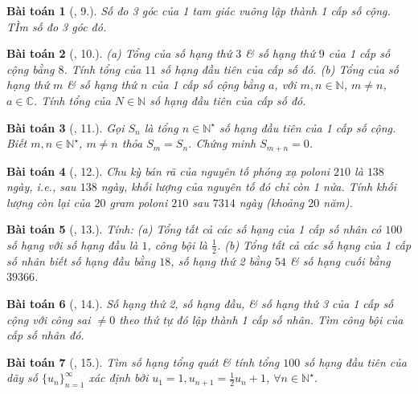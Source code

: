 \documentclass{article}
\newtheorem{baitoan}{Bài toán}
\begin{document}
\begin{baitoan}[\cite{TLCT_dai_so_giai_tich_11}, 9.]
	Số đo 3 góc của 1 tam giác vuông lập thành 1 cấp số cộng. TÌm số đo 3 góc đó.
\end{baitoan}

\begin{baitoan}[\cite{TLCT_dai_so_giai_tich_11}, 10.]
	(a) Tổng của số hạng thứ $3$ \& số hạng thứ $9$ của 1 cấp số cộng bằng $8$. Tính tổng của $11$ số hạng đầu tiên của cấp số đó. (b) Tổng của số hạng thứ $m$ \& số hạng thứ $n$ của 1 cấp số cộng bằng $a$, với $m,n\in\mathbb{N}$, $m\ne n$, $a\in\mathbb{C}$. Tính tổng của $N\in\mathbb{N}$ số hạng đầu tiên của cấp số đó.
\end{baitoan}

\begin{baitoan}[\cite{TLCT_dai_so_giai_tich_11}, 11.]
	Gọi $S_n$ là tổng $n\in\mathbb{N}^\star$ số hạng đầu tiên của 1 cấp số cộng. Biết $m,n\in\mathbb{N}^\star$, $m\ne n$ thỏa $S_m = S_n$. Chứng minh $S_{m+n} = 0$.
\end{baitoan}

\begin{baitoan}[\cite{TLCT_dai_so_giai_tich_11}, 12.]
	Chu kỳ bán rã của nguyên tố phóng xạ poloni $210$ là $138$ ngày, i.e., sau $138$ ngày, khối lượng của nguyên tố đó chỉ còn 1 nửa. Tính khối lượng còn lại của $20$ gram poloni $210$ sau $7314$ ngày (khoảng $20$ năm).
\end{baitoan}

\begin{baitoan}[\cite{TLCT_dai_so_giai_tich_11}, 13.]
	Tính: (a) Tổng tất cả các số hạng của 1 cấp số nhân có $100$ số hạng với số hạng đầu là $1$, công bội là $\frac{1}{2}$. (b) Tổng tất cả các số hạng của 1 cấp số nhân biết số hạng đầu bằng $18$, số hạng thứ 2 bằng $54$ \& số hạng cuối bằng $39366$.
\end{baitoan}

\begin{baitoan}[\cite{TLCT_dai_so_giai_tich_11}, 14.]
	Số hạng thứ 2, số hạng đầu, \& số hạng thứ 3 của 1 cấp số cộng với công sai $\ne0$ theo thứ tự đó lập thành 1 cấp số nhân. Tìm công bội của cấp số nhân đó.
\end{baitoan}

\begin{baitoan}[\cite{TLCT_dai_so_giai_tich_11}, 15.]
	Tìm số hạng tổng quát \& tính tổng $100$ số hạng đầu tiên của dãy số $\{u_n\}_{n=1}^\infty$ xác định bởi $u_1 = 1,u_{n+1} = \frac{1}{2}u_n + 1$, $\forall n\in\mathbb{N}^\star$.
\end{baitoan}
\end{document}
